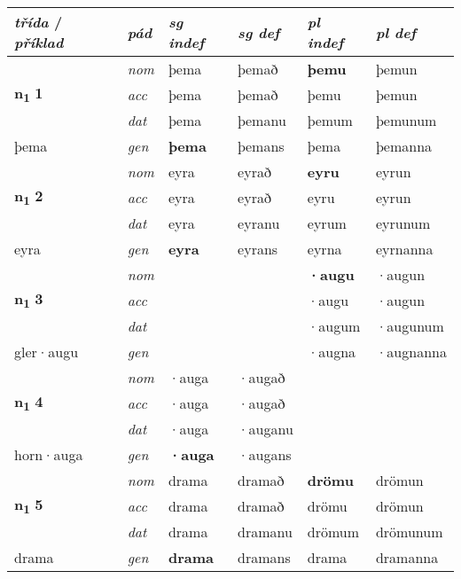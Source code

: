 \begin{longtable}[l]{X>{\footnotesize\itshape}XXXXX}
\toprule
{\textbf{\textit{třída}} / \textit{příklad}} & {\textit{pád}} & {\textit{sg indef}} & {\textit{sg def}} & {\textit{pl indef}} & {\textit{pl def}}\\
\midrule
\endhead
\multirow{3}{*}{{{\textbf{n{\textsubscript{1}}} \Large{\textbf{1}}}}} & nom & þema & þemað & \textbf{þemu} & þemun \\*
 & acc & þema & þemað & þemu & þemun \\*
 & dat & þema & þemanu & þemum & þemunum \\*
 {\footnotesize{þema}} & gen & \textbf{þema} & þemans & þema & þemanna \\
\midrule

\multirow{3}{*}{{{\textbf{n{\textsubscript{1}}} \Large{\textbf{2}}}}} & nom & eyra & eyrað & \textbf{eyru} & eyrun \\*
 & acc & eyra & eyrað & eyru & eyrun \\*
 & dat & eyra & eyranu & eyrum & eyrunum \\*
 {\footnotesize{eyra}} & gen & \textbf{eyra} & eyrans & eyrna & eyrnanna \\
\midrule

\multirow{3}{*}{{{\textbf{n{\textsubscript{1}}} \Large{\textbf{3}}}}} & nom &  &  & \textbf{·augu} & ·augun \\*
 & acc &  &  & ·augu & ·augun \\*
 & dat &  &  & ·augum & ·augunum \\*
 {\footnotesize{gler\allowbreak ·augu}} & gen & \textbf{} &  & ·augna & ·augnanna \\
\midrule

\multirow{3}{*}{{{\textbf{n{\textsubscript{1}}} \Large{\textbf{4}}}}} & nom & ·auga & ·augað & \textbf{} &  \\*
 & acc & ·auga & ·augað &  &  \\*
 & dat & ·auga & ·auganu &  &  \\*
 {\footnotesize{horn\allowbreak ·auga}} & gen & \textbf{·auga} & ·augans &  &  \\
\midrule

\multirow{3}{*}{{{\textbf{n{\textsubscript{1}}} \Large{\textbf{5}}}}} & nom & drama & dramað & \textbf{drömu} & drömun \\*
 & acc & drama & dramað & drömu & drömun \\*
 & dat & drama & dramanu & drömum & drömunum \\*
 {\footnotesize{drama}} & gen & \textbf{drama} & dramans & drama & dramanna \\
\midrule


\end{longtable}
